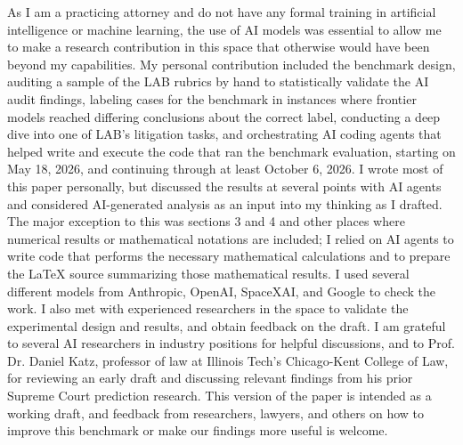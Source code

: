 \documentclass[11pt]{article}
\begin{document}
As I am a practicing attorney and do not have any formal training in artificial intelligence or machine learning, the use of AI models was essential to allow me to make a research contribution in this space that otherwise would have been beyond my capabilities. My personal contribution included the benchmark design, auditing a sample of the LAB rubrics by hand to statistically validate the AI audit findings, labeling cases for the benchmark in instances where frontier models reached differing conclusions about the correct label, conducting a deep dive into one of LAB's litigation tasks, and orchestrating AI coding agents that helped write and execute the code that ran the benchmark evaluation, starting on May 18, 2026, and continuing through at least October 6, 2026. I wrote most of this paper personally, but discussed the results at several points with AI agents and considered AI-generated analysis as an input into my thinking as I drafted. The major exception to this was sections 3 and 4 and other places where numerical results or mathematical notations are included; I relied on AI agents to write code that performs the necessary mathematical calculations and to prepare the LaTeX source summarizing those mathematical results. I used several different models from Anthropic, OpenAI, SpaceXAI, and Google to check the work. I also met with experienced researchers in the space to validate the experimental design and results, and obtain feedback on the draft. I am grateful to several AI researchers in industry positions for helpful discussions, and to Prof. Dr. Daniel Katz, professor of law at Illinois Tech's Chicago-Kent College of Law, for reviewing an early draft and discussing relevant findings from his prior Supreme Court prediction research. This version of the paper is intended as a working draft, and feedback from researchers, lawyers, and others on how to improve this benchmark or make our findings more useful is welcome.


\clearpage
\end{document}

